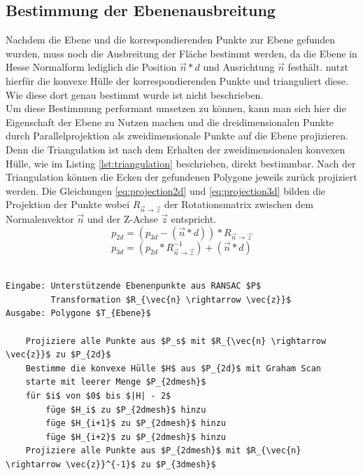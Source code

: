 \subsection{Bestimmung der Ebenenausbreitung}

Nachdem die Ebene und die korrespondierenden Punkte zur Ebene gefunden wurden, muss noch die Ausbreitung der Fläche bestimmt werden, da die Ebene in Hesse Normalform lediglich die Position \(\vec{n} * d\) und Ausrichtung \(\vec{n}\) festhält. \citet{PlanarSurfaceMapping} nutzt hierfür die konvexe Hülle der korrespondierenden Punkte und trianguliert diese. Wie diese dort genau bestimmt wurde ist nicht beschrieben. \\

Um diese Bestimmung performant umsetzen zu können, kann man sich hier die Eigenschaft der Ebene zu Nutzen machen und die dreidimensionalen Punkte durch Parallelprojektion als zweidimensionale Punkte auf die Ebene projizieren. Denn die Triangulation ist nach dem Erhalten der zweidimensionalen konvexen Hülle, wie im Listing \ref{lst:triangulation} beschrieben, direkt bestimmbar. Nach der Triangulation können die Ecken der gefundenen Polygone jeweils zurück projiziert werden. Die Gleichungen \ref{eq:projection2d} und \ref{eq:projection3d} bilden die Projektion der Punkte wobei \(R_{\vec{n} \rightarrow \vec{z}}\) der Rotationsmatrix zwischen dem Normalenvektor \(\vec{n}\) und der Z-Achse \(\vec{z}\) entspricht.\\

\begin{equation} \label{eq:projection2d}
p_{2d} = (p_{3d} - (\vec{n}*d)) * R_{\vec{n} \rightarrow \vec{z}}
\end{equation}
\begin{equation} \label{eq:projection3d}
p_{3d} = (p_{2d} * R_{\vec{n} \rightarrow \vec{z}}^{-1}) + (\vec{n}*d)
\end{equation}

\begin{lstlisting}[mathescape,caption=Bestimmung der Ebenenausbreitung und Triangulation, label=lst:triangulation, float=htbp]

Eingabe: Unterstützende Ebenenpunkte aus RANSAC $P$
         Transformation $R_{\vec{n} \rightarrow \vec{z}}$
Ausgabe: Polygone $T_{Ebene}$

    Projiziere alle Punkte aus $P_s$ mit $R_{\vec{n} \rightarrow \vec{z}}$ zu $P_{2d}$
    Bestimme die konvexe Hülle $H$ aus $P_{2d}$ mit Graham Scan
    starte mit leerer Menge $P_{2dmesh}$
    für $i$ von $0$ bis $|H| - 2$
        füge $H_i$ zu $P_{2dmesh}$ hinzu
        füge $H_{i+1}$ zu $P_{2dmesh}$ hinzu
        füge $H_{i+2}$ zu $P_{2dmesh}$ hinzu
    Projiziere alle Punkte aus $P_{2dmesh}$ mit $R_{\vec{n} \rightarrow \vec{z}}^{-1}$ zu $P_{3dmesh}$
   
\end{lstlisting}


